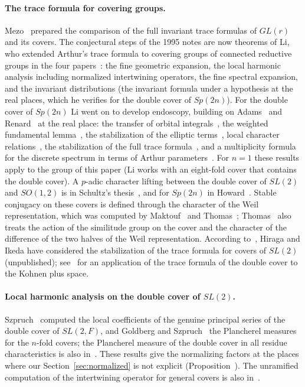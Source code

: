 \paragraph{The trace formula for covering groups.} Mezo~\cite{Me02,Me01}
prepared the comparison of the full invariant trace formulas of $GL(r)$
and its covers. The conjectural steps of the 1995 notes are now theorems
of Li, who extended Arthur's trace formula to covering groups of connected
reductive groups in the four papers~\cite{Li14a,Li12a,Li13,Li14b}: the fine
geometric expansion, the local harmonic analysis including normalized
intertwining operators, the fine spectral expansion, and the invariant
distributions (the invariant formula under a hypothesis at the real
places, which he verifies for the double cover of $Sp(2n)$). For the double cover of $Sp(2n)$ Li went on to
develop endoscopy, building on Adams~\cite{Ad98} and Renard~\cite{Re99} at
the real place: the transfer of orbital integrals~\cite{Li11}, the
weighted fundamental lemma~\cite{Li12b}, the stabilization of the elliptic
terms~\cite{Li15}, local character relations~\cite{Li19}, the
stabilization of the full trace formula~\cite{Li21}, and a multiplicity
formula for the discrete spectrum in terms of Arthur
parameters~\cite{Li24}. For $n=1$ these results apply to the group of
this paper (Li works with an eight-fold cover that contains the double
cover). A $p$-adic character lifting between
the double cover of $SL(2)$ and $SO(1,2)$ is in Schultz's
thesis~\cite{Sc98}, and for $Sp(2n)$ in Howard~\cite{Ho10}. Stable
conjugacy on these covers is defined through the character of the Weil
representation, which was computed by Maktouf~\cite{Ma99} and
Thomas~\cite{Th08}; Thomas~\cite{Th13} also treats the action of the
similitude group on the cover and the character of the difference of the
two halves of the Weil representation. According to~\cite{Li15}, Hiraga and Ikeda have
considered the stabilization of the trace formula for covers of $SL(2)$
(unpublished); see~\cite{HI13} for an application of the trace formula
of the double cover to the Kohnen plus space.

\paragraph{Local harmonic analysis on the double cover of $SL(2)$.}
Szpruch~\cite{Sz09} computed the local coefficients of
the genuine principal series of the double cover of $SL(2,F)$, and
Goldberg and Szpruch~\cite{GS16} the Plancherel measures for the $n$-fold
covers; the Plancherel measure of the double cover in all residue
characteristics is also in~\cite{Sz16}. These results give the
normalizing factors at the places where our Section~\ref{sec:normalized}
is not explicit (Proposition~\normref{}). The unramified computation of
the intertwining operator for general covers is also
in~\cite{Mc12,Ga14}.

